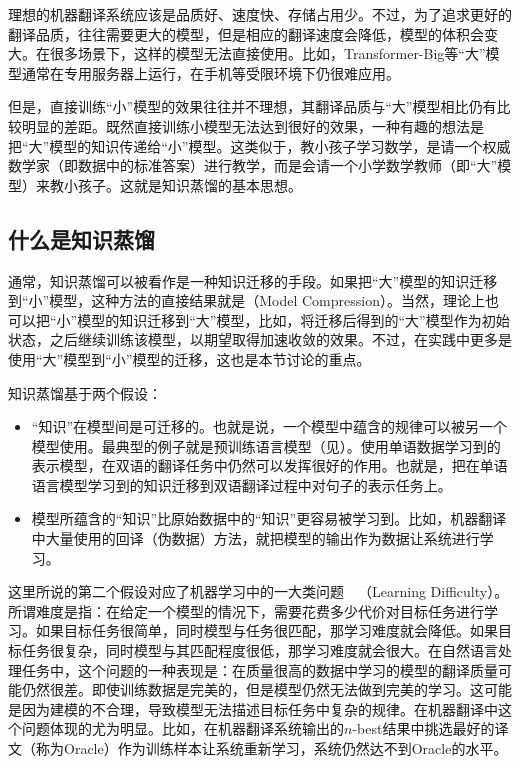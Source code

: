 \parinterval 理想的机器翻译系统应该是品质好、速度快、存储占用少。不过，为了追求更好的翻译品质，往往需要更大的模型，但是相应的翻译速度会降低，模型的体积会变大。在很多场景下，这样的模型无法直接使用。比如，Transformer-Big等“大”模型通常在专用服务器上运行，在手机等受限环境下仍很难应用。

\parinterval 但是，直接训练“小”模型的效果往往并不理想，其翻译品质与“大”模型相比仍有比较明显的差距。既然直接训练小模型无法达到很好的效果，一种有趣的想法是把“大”模型的知识传递给“小”模型。这类似于，教小孩子学习数学，是请一个权威数学家（即数据中的标准答案）进行教学，而是会请一个小学数学教师（即“大”模型）来教小孩子。这就是知识蒸馏的基本思想。


\subsection{什么是知识蒸馏}

\parinterval 通常，知识蒸馏可以被看作是一种知识迁移的手段。如果把“大”模型的知识迁移到“小”模型，这种方法的直接结果就是{\small{}}（Model Compression）。当然，理论上也可以把“小”模型的知识迁移到“大”模型，比如，将迁移后得到的“大”模型作为初始状态，之后继续训练该模型，以期望取得加速收敛的效果。不过，在实践中更多是使用“大”模型到“小”模型的迁移，这也是本节讨论的重点。

\parinterval 知识蒸馏基于两个假设：

\begin{itemize}
\vspace{0.5em}
\item “知识”在模型间是可迁移的。也就是说，一个模型中蕴含的规律可以被另一个模型使用。最典型的例子就是预训练语言模型（见{\chapternine}）。使用单语数据学习到的表示模型，在双语的翻译任务中仍然可以发挥很好的作用。也就是，把在单语语言模型学习到的知识迁移到双语翻译过程中对句子的表示任务上。
\vspace{0.5em}
\item 模型所蕴含的“知识”比原始数据中的“知识”更容易被学习到。比如，机器翻译中大量使用的回译（伪数据）方法，就把模型的输出作为数据让系统进行学习。
\vspace{0.5em}
\end{itemize}

\parinterval 这里所说的第二个假设对应了机器学习中的一大类问题\ \dash \ {\small{}}（Learning Difficulty）。所谓难度是指：在给定一个模型的情况下，需要花费多少代价对目标任务进行学习。如果目标任务很简单，同时模型与任务很匹配，那学习难度就会降低。如果目标任务很复杂，同时模型与其匹配程度很低，那学习难度就会很大。在自然语言处理任务中，这个问题的一种表现是：在质量很高的数据中学习的模型的翻译质量可能仍然很差。即使训练数据是完美的，但是模型仍然无法做到完美的学习。这可能是因为建模的不合理，导致模型无法描述目标任务中复杂的规律。在机器翻译中这个问题体现的尤为明显。比如，在机器翻译系统输出的$n$-best结果中挑选最好的译文（称为Oracle）作为训练样本让系统重新学习，系统仍然达不到Oracle的水平。

